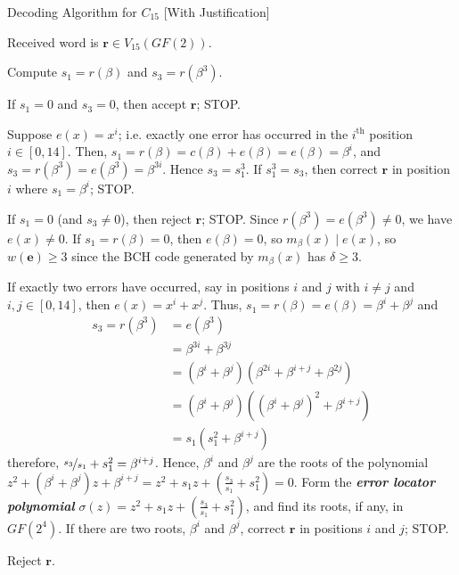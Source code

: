 \begin{algbox}
    \begin{algorithm}[H]
        \caption{Decoding Algorithm for $ C_{15} $ [With Justification]}
        Received word is $ \bm{r}\in V_{15}(GF(2)) $.

        Compute $ s_1=r(\beta) $ and $ s_3=r(\beta^3) $.

        If $ s_1=0 $ and $ s_3=0 $, then accept $ \bm{r} $; STOP.

        Suppose $ e(x)=x^i $; i.e. exactly one error has occurred in the $ i^{\text{th}} $
        position $ i\in[0,14] $. Then, $ s_1=r(\beta)=c(\beta)+e(\beta)=e(\beta)=\beta^i $,
        and $ s_3=r(\beta^3)=e(\beta^3)=\beta^{3i} $. Hence $ s_3=s_1^3 $.
        If $ s_1^3=s_3 $, then correct $ \bm{r} $ in position $ i $ where $ s_1=\beta^i $;
        STOP.

        If $ s_1=0 $ (and $ s_3\neq 0 $), then reject $ \bm{r} $; STOP.
        Since $ r(\beta^3)=e(\beta^3)\neq 0 $, we have $ e(x)\neq 0 $. If $ s_1=r(\beta)=0 $,
        then $ e(\beta)=0 $, so $ m_{\beta}(x)\mid e(x) $, so $ w(\bm{e})\geqslant 3 $
        since the BCH code generated by $ m_{\beta}(x) $ has $ \delta\geqslant 3 $.

        If exactly two errors have occurred, say in positions $ i $ and $ j $ with
        $ i\neq j $ and $ i,j\in[0,14] $, then $ e(x)=x^i+x^j $. Thus, $ s_1=r(\beta)=
            e(\beta)=\beta^i+\beta^j $ and
        \begin{align*}
            s_3=r(\beta^3)
             & =e(\beta^3)                                           \\
             & =\beta^{3i}+\beta^{3j}                                \\
             & =(\beta^i+\beta^j)(\beta^{2i}+\beta^{i+j}+\beta^{2j}) \\
             & =(\beta^i+\beta^j)((\beta^i+\beta^j)^2+\beta^{i+j})   \\
             & =s_1(s_1^2+\beta^{i+j})
        \end{align*}
        therefore, $ \nicefrac{s_3}{s_1}+s_1^2=\beta^{i+j} $. Hence, $ \beta^i $
        and $ \beta^j $ are the roots of the polynomial $ z^2+(\beta^i+\beta^j)z+\beta^{i+j}=
            z^2+s_1z+\left( \frac{s_3}{s_1} +s_1^2 \right)=0 $. Form the
        \textbf\emph{{error locator polynomial}}
        $ \sigma(z)=z^2+s_1z+\left( \frac{s_3}{s_1} +s_1^2 \right) $, and find its
        roots, if any, in $ GF(2^4) $. If there are two roots, $ \beta^i $
        and $ \beta^j $, correct $ \bm{r} $ in positions $ i $ and $ j $; STOP.

        Reject $ \bm{r} $.
    \end{algorithm}
\end{algbox}

